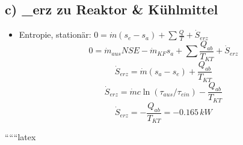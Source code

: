 \subsection*{c) _{erz} zu Reaktor \& Kühlmittel}

\begin{itemize}
    \item Entropie, stationär: \(0 = \dot{m} (s_e - s_a) + \sum \frac{Q}{T} + \dot{S}_{erz}\)
    \[
    0 = \dot{m}_{aus} NSE - \dot{m}_{KF} s_a + \sum \frac{Q_{ab}}{T_{KT}} + \dot{S}_{erz}
    \]
    \[
    \dot{S}_{erz} = \dot{m} (s_a - s_e) + \frac{Q_{ab}}{T_{KT}}
    \]
    \[
    \dot{S}_{erz} = \dot{m} c \ln (\tau_{aus} / \tau_{ein}) - \frac{Q_{ab}}{T_{KT}}
    \]
    \[
    \dot{S}_{erz} = -\frac{Q_{ab}}{T_{KT}} = -0.165 \, kW
    \]
\end{itemize}

``````latex